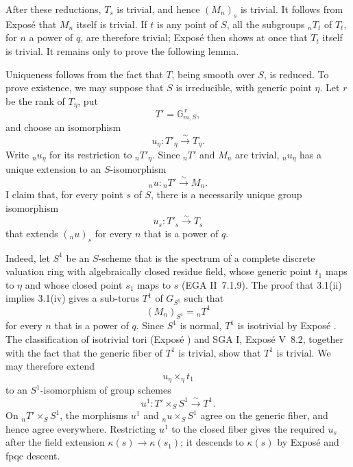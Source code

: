 After these reductions, \(T_s\) is trivial, and hence
\((M_n)_s\) is trivial. It follows from Exposé  that \(M_n\)
itself is trivial. If \(t\) is any point of \(S\), all the
subgroups \({}_nT_t\) of \(T_t\), for \(n\) a power of \(q\), are
therefore trivial; Exposé  then shows at once that \(T_t\)
itself is trivial. It remains only to prove the following lemma.


Uniqueness follows from the fact that \(T\), being smooth over
\(S\), is reduced. To prove existence, we may suppose that \(S\)
is irreducible, with generic point \(\eta\). Let \(r\) be the rank
of \(T_\eta\), put
\[
  T'=\mathbb G_{m,S}^{\,r},
\]
and choose an isomorphism
\[
  u_\eta:T'_\eta\xrightarrow{\sim}T_\eta.
\]
Write \({}_nu_\eta\) for its restriction to \({}_nT'_\eta\).
Since \({}_nT'\) and \(M_n\) are trivial, \({}_nu_\eta\) has a
unique extension to an \(S\)-isomorphism
\[
  {}_nu:{}_nT'\xrightarrow{\sim}M_n.
\]
I claim that, for every point \(s\) of \(S\), there is a
necessarily unique group isomorphism
\[
  u_s:T'_s\xrightarrow{\sim}T_s
\]
that extends \(({}_nu)_s\) for every \(n\) that is a power of
\(q\).

Indeed, let \(S^1\) be an \(S\)-scheme that is the spectrum of a
complete discrete valuation ring with algebraically closed residue
field, whose generic point \(t_1\) maps to \(\eta\) and whose
closed point \(s_1\) maps to \(s\) (EGA II~7.1.9). The proof that
3.1(ii) implies 3.1(iv) gives a sub-torus \(T^1\) of \(G_{S^1}\)
such that
\[
  (M_n)_{S^1}={}_nT^1
\]
for every \(n\) that is a power of \(q\). Since \(S^1\) is normal,
\(T^1\) is isotrivial by Exposé . The classification of
isotrivial tori (Exposé ) and SGA I, Exposé V~8.2, together
with the fact that the generic fiber of \(T^1\) is trivial, show
that \(T^1\) is trivial. We may therefore extend
\[
  u_\eta\times_\eta t_1
\]
to an \(S^1\)-isomorphism of group schemes
\[
  u^1:T'\times_S S^1\xrightarrow{\sim}T^1.
\]
On \({}_nT'\times_S S^1\), the morphisms \(u^1\) and
\({}_nu\times_S S^1\) agree on the generic fiber, and hence agree
everywhere. Restricting \(u^1\) to the closed fiber gives the
required \(u_s\) after the field extension
\(\kappa(s)\to\kappa(s_1)\); it descends to \(\kappa(s)\) by
Exposé  and fpqc descent.

